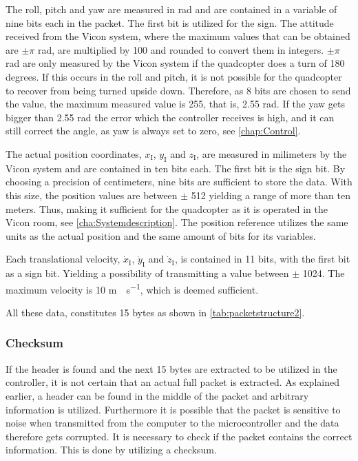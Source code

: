 The roll, pitch and yaw are measured in rad and are contained in a variable of nine bits each in the packet. The first bit is utilized for the sign. The attitude received from the Vicon system, where the maximum values that can be obtained are $\pm\pi$ rad, are multiplied by 100 and rounded to convert them in integers. $\pm\pi$ rad are only measured by the Vicon system if the quadcopter does a turn of 180 degrees. If this occurs in the roll and pitch, it is not possible for the quadcopter to recover from being turned upside down. Therefore, as 8 bits are chosen to send the value, the maximum measured value is 255, that is, 2.55 rad. If the yaw gets bigger than 2.55 rad the error which the controller receives is high, and it can still correct the angle, as yaw is always set to zero, see \autoref{chap:Control}.

The actual position coordinates, $x_{\mathrm{I}}$, $y_{\mathrm{I}}$ and $z_{\mathrm{I}}$, are measured in milimeters by the Vicon system and are contained in ten bits each. The first bit is the sign bit. By choosing a precision of centimeters, nine bits are sufficient to store the data. With this size, the position values are between $\pm$ 512 yielding a range of more than ten meters. Thus, making it sufficient for the quadcopter as it is operated in the Vicon room, see \autoref{cha:Systemdescription}. The position reference utilizes the same units as the actual position and the same amount of bits for its variables.

Each translational velocity, $\dot{x}_{\mathrm{I}}$, $\dot{y}_{\mathrm{I}}$ and $\dot{z}_{\mathrm{I}}$, is contained in 11 bits, with the first bit as a sign bit. Yielding a possibility of transmitting a value between $\pm$ 1024. The maximum velocity is 10 \si{m \cdot s^{-1}}, which is deemed sufficient.

All these data, constitutes 15 bytes as shown in \autoref{tab:packetstructure2}.


\subsubsection{Checksum}
If the header is found and the next 15 bytes are extracted to be utilized in the controller, it is not certain that an actual full packet is extracted. As explained earlier, a header can be found in the middle of the packet and arbitrary information is utilized. Furthermore it is possible that the packet is sensitive to noise when transmitted from the computer to the microcontroller and the data therefore gets corrupted. It is necessary to check if the packet contains the correct information. This is done by utilizing a checksum. 

